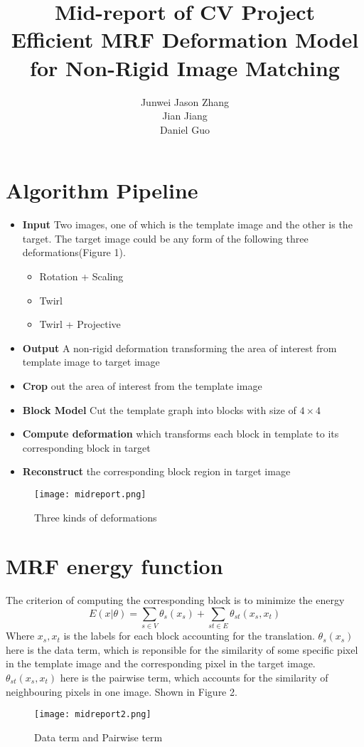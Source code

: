 \documentclass[11pt]{article}
\author{Junwei Jason Zhang \\Jian Jiang\\ Daniel Guo}
\title{Mid-report of CV Project\\Efficient MRF Deformation Model for Non-Rigid Image Matching}
\begin{document}
\maketitle

\section{Algorithm Pipeline}
\begin{itemize}
    \item
    \textbf{Input} Two images, one of which is the template image and the other is the target. The target image could be any form of the following three deformations(Figure 1).
        \begin{itemize}
            \item Rotation + Scaling
            \item Twirl
            \item Twirl + Projective
        \end{itemize}
    \item 
    \textbf{Output} A non-rigid deformation transforming the area of interest from template image to target image
    \item
    \textbf{Crop} out the area of interest from the template image
    \item
    \textbf{Block Model} Cut the template graph into blocks with size of $4\times 4$
    \item
    \textbf{Compute deformation} which transforms each block in template to its corresponding block in target
    \item
    \textbf{Reconstruct} the corresponding block region in target image
\end{itemize}
\begin{figure}[!htp]
    \centering
    \texttt{[image: midreport.png]}
    \caption{Three kinds of deformations}
\end{figure}
\section{MRF energy function}
The criterion of computing the corresponding block is to minimize the energy 
\begin{equation}
E(x|\theta ) = \sum_{s \in V} \theta_s (x_s)+ \sum_{st \in E} \theta_{st} (x_s,x_t)
\end{equation}
Where $x_s, x_t$ is the labels for each block accounting for the translation. $\theta_s(x_s)$ here is the data term, which is reponsible for the similarity of some specific pixel in the template image and the corresponding pixel in the target image. $\theta_{st} (x_s, x_t)$ here is the pairwise term, which accounts for the similarity of neighbouring pixels in one image. Shown in Figure 2.
\begin{figure}[!htp]
    \centering
    \texttt{[image: midreport2.png]}
    \caption{Data term and Pairwise term}
\end{figure}
\end{document}
